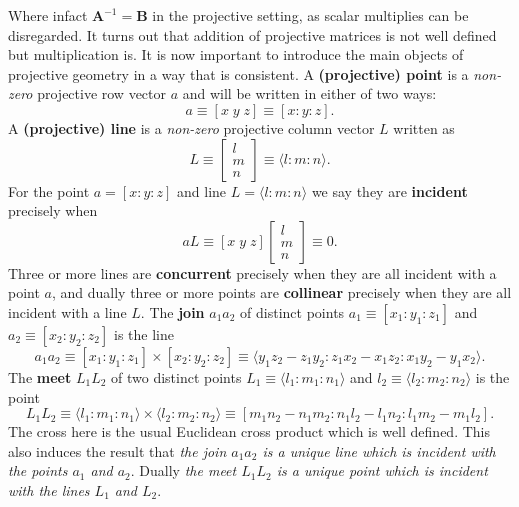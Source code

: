 \documentclass[11pt]{article}
\begin{document}
Where infact $\mathbf{A}^{-1}=\mathbf{B}$ in the projective setting, as
scalar multiplies can be disregarded. It turns out that addition of
projective matrices is not well defined but multiplication is.\newline
It is now important to introduce the main objects of projective geometry in
a way that is consistent. A \textbf{(projective) point} is a \textit{non-zero%
} projective row vector $a$ and will be written in either of two ways: 
\begin{equation*}
a\equiv[x\;y\;z]\equiv[x:y:z].
\end{equation*}
A \textbf{(projective) line} is a \textit{non-zero} projective column vector 
$L$ written as 
\begin{equation*}
L\equiv%
\begin{bmatrix}
l \\ 
m \\ 
n%
\end{bmatrix}%
\equiv\langle l:m:n\rangle.
\end{equation*}
For the point $a=[x:y:z]$ and line $L=\langle l:m:n\rangle$ we say they are 
\textbf{incident} precisely when 
\begin{equation}
aL\equiv[x\;y\;z]%
\begin{bmatrix}
l \\ 
m \\ 
n%
\end{bmatrix}%
\equiv0.
\end{equation}
Three or more lines are \textbf{concurrent} precisely when they are all
incident with a point $a$, and dually three or more points are \textbf{%
collinear} precisely when they are all incident with a line $L$.\newline
The \textbf{join} $a_{1}a_{2}$ of distinct points $a_{1}\equiv[%
x_{1}:y_{1}:z_{1}]$ and $a_{2}\equiv[x_{2}:y_{2}:z_{2}]$ is the line 
\begin{equation*}
a_{1}a_{2}\equiv[x_{1}:y_{1}:z_{1}]\times[x_{2}:y_{2}:z_{2}]\equiv\langle
y_{1}z_{2}-z_{1}y_{2}:z_{1}x_{2}-x_{1}z_{2}:x_{1}y_{2}-y_{1}x_{2}\rangle.
\end{equation*}
The \textbf{meet} $L_{1}L_{2}$ of two distinct points $L_{1}\equiv\langle
l_{1}:m_{1}:n_{1}\rangle$ and $l_{2}\equiv\langle l_{2}:m_{2}:n_{2}\rangle$
is the point 
\begin{equation*}
L_{1}L_{2}\equiv\langle l_{1}:m_{1}:n_{1}\rangle\times\langle
l_{2}:m_{2}:n_{2}\rangle\equiv[%
m_{1}n_{2}-n_{1}m_{2}:n_{1}l_{2}-l_{1}n_{2}:l_{1}m_{2}-m_{1}l_{2}].
\end{equation*}
The cross here is the usual Euclidean cross product which is well defined.
This also induces the result that \textit{the join $a_{1}a_{2}$ is a unique
line which is incident with the points $a_{1}$ and $a_{2}$}. Dually \textit{%
the meet $L_{1}L_{2}$ is a unique point which is incident with the lines $%
L_{1}$ and $L_{2}$}.
\end{document}
